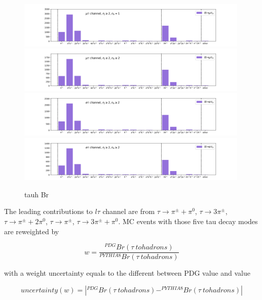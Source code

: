 \begin{figure}
    \centering
    \includegraphics[width=0.99\textwidth]{chapters/Appendix/sectionTauBr/figures/tauhDecay_mutau.png}
    \includegraphics[width=0.99\textwidth]{chapters/Appendix/sectionTauBr/figures/tauhDecay_mutau2.png}
    \includegraphics[width=0.99\textwidth]{chapters/Appendix/sectionTauBr/figures/tauhDecay_etau.png}
    \includegraphics[width=0.99\textwidth]{chapters/Appendix/sectionTauBr/figures/tauhDecay_etau2.png}


    \caption{tauh Br}
    \label{fig:appendix:reweightTauhBr:tauhBr}
\end{figure}


The leading contributions to $l\tau$ channel are from $\tau\to
\pi^\pm+\pi^0 $, $\tau\to 3\pi^\pm$, $\tau\to \pi^\pm+2\pi^0$, $\tau\to
\pi^\pm$, $\tau\to 3\pi^\pm + \pi^0$. MC events with those five tau
decay modes are reweighted by 

\begin{equation}
  w = \frac{^{PDG} Br(\tau\ to  hadrons) }{^{PYTHIA8} Br(\tau\ to  hadrons)}
\end{equation} 

with a weight uncertainty equals to the different between PDG value and
 value

\begin{equation}
  uncertainty(w) = |^{PDG} Br(\tau\ to  hadrons) - ^{PYTHIA8} Br(\tau\ to  hadrons) |
\end{equation} 

